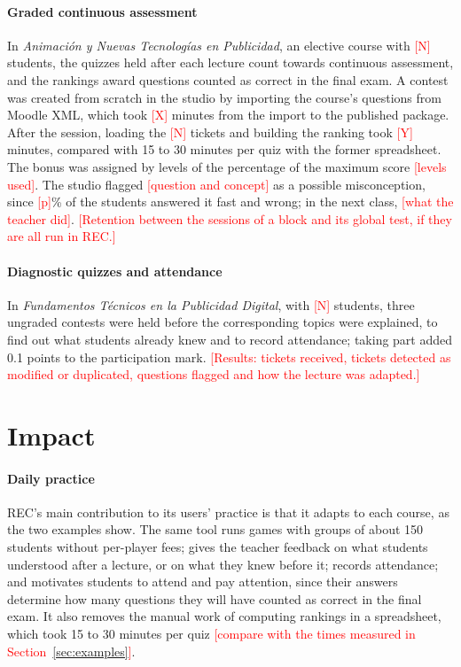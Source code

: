 \documentclass[preprint,12pt, a4paper]{elsarticle}
\newcommand{\todo}[1]{\textcolor{red}{[#1]}}
\begin{document}
\paragraph{Graded continuous assessment} In \emph{Animación y Nuevas Tecnologías en Publicidad}, an elective course with \todo{N} students, the quizzes held after each lecture count towards continuous assessment, and the rankings award questions counted as correct in the final exam. A contest was created from scratch in the studio by importing the course's questions from Moodle XML, which took \todo{X} minutes from the import to the published package. After the session, loading the \todo{N} tickets and building the ranking took \todo{Y} minutes, compared with 15 to 30 minutes per quiz with the former spreadsheet. The bonus was assigned by levels of the percentage of the maximum score \todo{levels used}. The studio flagged \todo{question and concept} as a possible misconception, since \todo{p}\% of the students answered it fast and wrong; in the next class, \todo{what the teacher did}. \todo{Retention between the sessions of a block and its global test, if they are all run in REC.}

\paragraph{Diagnostic quizzes and attendance} In \emph{Fundamentos Técnicos en la Publicidad Digital}, with \todo{N} students, three ungraded contests were held before the corresponding topics were explained, to find out what students already knew and to record attendance; taking part added 0.1 points to the participation mark. \todo{Results: tickets received, tickets detected as modified or duplicated, questions flagged and how the lecture was adapted.}

\section{Impact}
\label{sec:impact}

\paragraph{Daily practice} REC's main contribution to its users' practice is that it adapts to each course, as the two examples show. The same tool runs games with groups of about 150 students without per-player fees; gives the teacher feedback on what students understood after a lecture, or on what they knew before it; records attendance; and motivates students to attend and pay attention, since their answers determine how many questions they will have counted as correct in the final exam. It also removes the manual work of computing rankings in a spreadsheet, which took 15 to 30 minutes per quiz \todo{compare with the times measured in Section~\ref{sec:examples}}.
\end{document}
